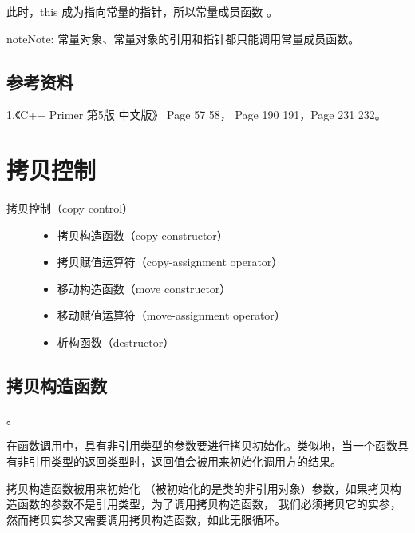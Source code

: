 \documentclass[letterpaper,10pt,english]{sphinxmanual}
\begin{document}
此时，this 成为指向常量的指针，所以常量成员函数  。

\begin{sphinxadmonition}{note}{Note:}
常量对象、常量对象的引用和指针都只能调用常量成员函数。
\end{sphinxadmonition}


\subsection{参考资料}
\label{\detokenize{cpp/22_const:id3}}
1.《C++ Primer 第5版 中文版》 Page 57 \textendash{} 58， Page 190 \textendash{} 191，Page 231 \textendash{} 232。


\section{拷贝控制}
\label{\detokenize{cpp/23_copyControl::doc}}\label{\detokenize{cpp/23_copyControl:id1}}\begin{description}
\item[{拷贝控制（copy control）}] \leavevmode\begin{itemize}
\item {} 
拷贝构造函数（copy constructor）

\item {} 
拷贝赋值运算符（copy-assignment operator）

\item {} 
移动构造函数（move constructor）

\item {} 
移动赋值运算符（move-assignment operator）

\item {} 
析构函数（destructor）

\end{itemize}

\end{description}


\subsection{拷贝构造函数}
\label{\detokenize{cpp/23_copyControl:id2}}
 。

在函数调用中，具有非引用类型的参数要进行拷贝初始化。类似地，当一个函数具有非引用类型的返回类型时，返回值会被用来初始化调用方的结果。

拷贝构造函数被用来初始化  （被初始化的是类的非引用对象）参数，如果拷贝构造函数的参数不是引用类型，为了调用拷贝构造函数，
我们必须拷贝它的实参，然而拷贝实参又需要调用拷贝构造函数，如此无限循环。
\end{document}
